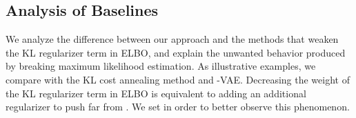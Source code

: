 \documentclass{article} \usepackage{iclr2019_conference,times}
\begin{document}
\begin{table}[!t]
\caption{Comparison of total training time, in terms of relative speed and absolute hours.}
\label{timing-table}
\centering
\vspace{-3mm}
\end{table}

\subsection{Analysis of Baselines}
\label{sec:mi}
We analyze the difference between our approach and the methods that weaken the KL regularizer term in ELBO, and explain the unwanted behavior produced by breaking maximum likelihood estimation. As illustrative examples, we compare with the KL cost annealing method and -VAE. Decreasing the weight of the KL regularizer term in ELBO is equivalent to adding an additional regularizer to push  far from . We set  in order to better observe this phenomenon.
\end{document}
